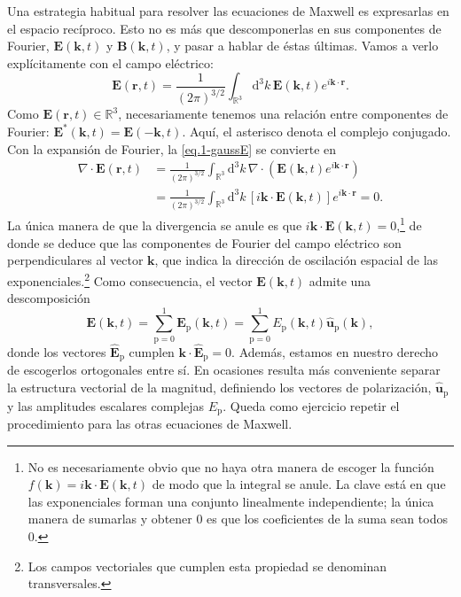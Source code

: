 Una estrategia habitual para resolver las ecuaciones de Maxwell es expresarlas en el espacio recíproco. Esto no es más que descomponerlas en sus componentes de Fourier, \(\mathbf{E}(\mathbf{k}, t)\) y \(\mathbf{B}(\mathbf{k}, t)\), y pasar a hablar de éstas últimas. Vamos a verlo explícitamente con el campo eléctrico:
\begin{equation}
    \label{eq.1-eFourier}
    \mathbf{E}(\mathbf{r}, t) = \frac{1}{(2\pi)^{3/2}}\int_{\mathbb{R}^3} \mathrm{d}^3 k\, \mathbf{E}(\mathbf{k}, t) e^{i\mathbf{k}\cdot\mathbf{r}}.
\end{equation}
Como \(\mathbf{E}(\mathbf{r}, t)\in\mathbb{R}^3\), necesariamente tenemos una relación entre componentes de Fourier: \(\mathbf{E}^*(\mathbf{k}, t) = \mathbf{E}(-\mathbf{k}, t)\). Aquí, el asterisco denota el complejo conjugado. Con la expansión de Fourier, la \cref{eq.1-gaussE} se convierte en
\begin{align}
    \nonumber
    \nabla\cdot\mathbf{E}(\mathbf{r}, t) &= \frac{1}{(2\pi)^{3/2}}\int_{\mathbb{R}^3} \mathrm{d}^3 k\, \nabla\cdot\left(\mathbf{E}(\mathbf{k}, t) e^{i\mathbf{k}\cdot\mathbf{r}}\right) \\
    &= \frac{1}{(2\pi)^{3/2}}\int_{\mathbb{R}^3} \mathrm{d}^3 k\, \left[i\mathbf{k}\cdot\mathbf{E}(\mathbf{k}, t)\right] e^{i\mathbf{k}\cdot\mathbf{r}} = 0.
\end{align}
La única manera de que la divergencia se anule es que \(i\mathbf{k}\cdot\mathbf{E}(\mathbf{k}, t) = 0\),\footnote{No es necesariamente obvio que no haya otra manera de escoger la función \(f(\mathbf{k}) = i\mathbf{k}\cdot\mathbf{E}(\mathbf{k}, t)\) de modo que la integral se anule. La clave está en que las exponenciales forman una conjunto linealmente independiente; la única manera de sumarlas y obtener 0 es que los coeficientes de la suma sean todos 0.} de donde se deduce que las componentes de Fourier del campo eléctrico son perpendiculares al vector \(\mathbf{k}\), que indica la dirección de oscilación espacial de las exponenciales.\footnote{Los campos vectoriales que cumplen esta propiedad se denominan transversales.} Como consecuencia, el vector \(\mathbf{E}(\mathbf{k}, t)\) admite una descomposición
\begin{equation}
    \mathbf{E}(\mathbf{k},t) = \sum_{\mathrm{p}=0}^1 \mathbf{E}_\mathrm{p}(\mathbf{k}, t) = \sum_{\mathrm{p}=0}^1 E_\mathrm{p}(\mathbf{k},t)\hat{\mathbf{u}}_\mathrm{p}(\mathbf{k}),
\end{equation}
donde los vectores \(\hat{\mathbf{E}}_\mathrm{p}\) cumplen \(\mathbf{k}\cdot\hat{\mathbf{E}}_\mathrm{p} = 0\). Además, estamos en nuestro derecho de escogerlos ortogonales entre sí. En ocasiones resulta más conveniente separar la estructura vectorial de la magnitud, definiendo los vectores de polarización, \(\hat{\mathbf{u}}_\mathrm{p}\) y las amplitudes escalares complejas \(E_\mathrm{p}\). Queda como ejercicio repetir el procedimiento para las otras ecuaciones de Maxwell.

